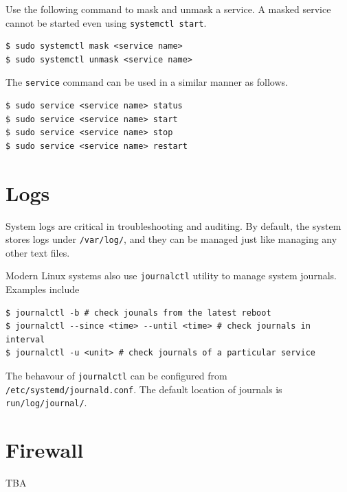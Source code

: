 Use the following command to mask and unmask a service. A masked service cannot be started even using \verb|systemctl start|.
\begin{lstlisting}
$ sudo systemctl mask <service name>
$ sudo systemctl unmask <service name>
\end{lstlisting}

The \verb|service| command can be used in a similar manner as follows.
\begin{lstlisting}
$ sudo service <service name> status
$ sudo service <service name> start
$ sudo service <service name> stop
$ sudo service <service name> restart
\end{lstlisting}

\section{Logs}

System logs are critical in troubleshooting and auditing. By default, the system stores logs under \verb|/var/log/|, and they can be managed just like managing any other text files.

Modern Linux systems also use \verb|journalctl| utility to manage system journals. Examples include
\begin{lstlisting}
$ journalctl -b # check jounals from the latest reboot
$ journalctl --since <time> --until <time> # check journals in interval
$ journalctl -u <unit> # check journals of a particular service
\end{lstlisting}
The behavour of \verb|journalctl| can be configured from \texttt{/etc/systemd/journald.conf}. The default location of journals is \texttt{run/log/journal/}.

\section{Firewall}

TBA












